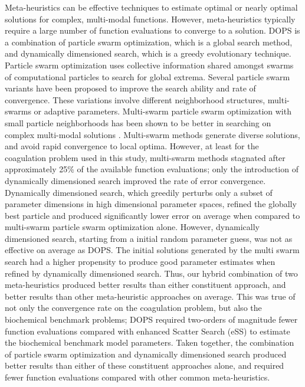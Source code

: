 \documentclass{bmcart}
\begin{document}
Meta-heuristics can be effective techniques to estimate optimal or nearly optimal solutions for complex, multi-modal functions.
However, meta-heuristics typically require a large number of function evaluations to converge to a solution.
DOPS is a combination of particle swarm optimization, which is a global search method, and dynamically dimensioned search, which is a greedy evolutionary technique.
Particle swarm optimization uses collective information shared amongst swarms of computational particles to
search for global extrema. Several particle swarm variants have been proposed to improve the search ability and rate of convergence.
These variations involve different neighborhood structures, multi-swarms or adaptive parameters.
Multi-swarm particle swarm optimization with small particle neighborhoods has been shown to be better in searching on complex multi-modal solutions \cite{zhao2008dynamic}.
Multi-swarm methods generate diverse solutions, and avoid rapid convergence to local optima.
However, at least for the coagulation problem used in this study, multi-swarm methods stagnated after approximately 25\% of the available function evaluations; only the introduction of dynamically dimensioned search improved the rate of error convergence.
Dynamically dimensioned search, which greedily perturbs only a subset of parameter dimensions in high dimensional parameter spaces,
refined the globally best particle and produced significantly lower error on average when compared to multi-swarm particle swarm optimization alone.
However, dynamically dimensioned search, starting from a initial random parameter guess, was not as effective on average as DOPS.
The initial solutions generated by the multi swarm search had a higher propensity to produce good parameter estimates when refined by dynamically dimensioned search.
Thus, our hybrid combination of two meta-heuristics produced better results than either constituent approach, and better results than other meta-heuristic approaches on average.
This was true of not only the convergence rate on the coagulation problem, but also the biochemical benchmark problems;
DOPS required two-orders of magnitude fewer function evaluations compared with enhanced Scatter Search (eSS) to estimate the biochemical benchmark model parameters.
Taken together, the combination of particle swarm optimization and dynamically dimensioned search produced better results than either of these constituent approaches alone,
and required fewer function evaluations compared with other common meta-heuristics.
\end{document}
